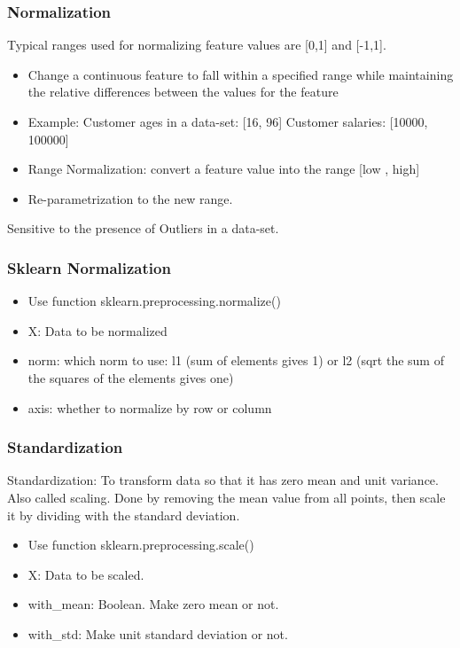 \begin{frame}[fragile]\frametitle{Normalization}	
Typical ranges used for normalizing feature values are [0,1] and [-1,1].

\begin{itemize}
\item Change a continuous feature to fall within a specified range while maintaining the relative differences between the values for the feature
\item Example:
Customer ages in a data-set: [16, 96]
Customer salaries: [10000, 100000]
\item Range Normalization: convert a feature value into the range [low , high] 
\item Re-parametrization to the new range.
\end{itemize}
Sensitive to the presence of Outliers in a data-set.
\end{frame}

\begin{frame}[fragile]\frametitle{Sklearn Normalization}
	\begin{itemize}
	\item Use function sklearn.preprocessing.normalize()
	\item  X: Data to be normalized
	\item norm: which norm to use: l1 (sum of elements gives 1) or l2 (sqrt the sum of the squares of the elements gives one)
	\item axis: whether to normalize by row or column
	\end{itemize}
\end{frame}






\begin{frame}[fragile]\frametitle{Standardization}
Standardization: To transform data so that it has zero mean and unit variance. Also called scaling.
Done by removing the mean value from all points, then scale it by dividing with the standard deviation.
	\begin{itemize}
	\item Use function sklearn.preprocessing.scale()
	\item  X: Data to be scaled.
	\item with\_mean: Boolean. Make zero mean or not.
	\item with\_std: Make unit standard deviation or not.
	\end{itemize}
\end{frame}



